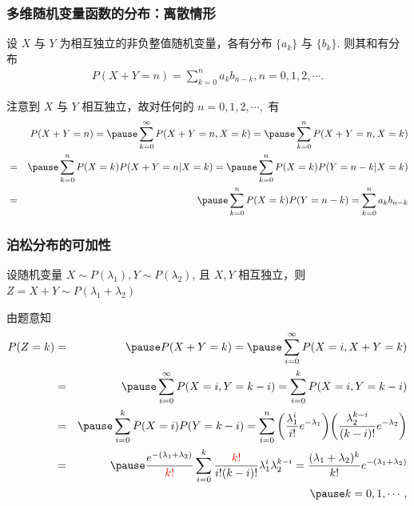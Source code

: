 \documentclass[Prob-All.tex]{subfiles}
\begin{document}
%
%
%
 \begin{frame}
 	\frametitle{多维随机变量函数的分布：离散情形}
 	\begin{thm}[离散卷积公式] 设 $X$ 与 $Y$ 为相互独立的非负整值随机变量，各有分布 $\{a_k\}$ 与 $\{b_k\}$. 则其和有分布
 		\begin{eqnarray*}
 			P(X+Y=n)=\sum_{k=0}^na_kb_{n-k}, n=0,1,2,\cdots.
 		\end{eqnarray*}
 	\end{thm}
 	\pause \zheng 注意到 $X$ 与 $Y$ 相互独立，故对任何的 $n=0,1,2,\cdots,$ 有
 	\begin{eqnarray*}
 		&&\hspace{-0.7cm}P(X+Y=n)=\pause \sum_{k=0}^\infty P(X+Y=n,X=k)=\pause \sum_{k=0}^n P(X+Y=n,X=k)\\
 		&=&\pause \sum_{k=0}^n P(X=k)P(X+Y=n|X=k)=\pause \sum_{k=0}^n P(X=k)P(Y=n-k|X=k)\\
 		&=&\pause \sum_{k=0}^n P(X=k)P(Y=n-k)=\sum_{k=0}^n a_kb_{n-k}
 	\end{eqnarray*}
 \end{frame}

 \begin{frame}
 	\frametitle{泊松分布的可加性}
 	\begin{exam}[泊松分布的可加性] 设随机变量 $X\sim P (\lambda_1), Y\sim P (\lambda_2)$, 且 $X,Y$ 相互独立，则 $Z=X+Y\sim P (\lambda_1+\lambda_2)$
 	\end{exam}

 	\pause \jieda 由题意知
 	\begin{eqnarray*}
 		P(Z=k)&=&\pause P(X+Y=k)=\pause \sum_{i=0}^\infty P(X=i, X+Y=k)\\
 		&=&\pause \sum_{i=0}^\infty P(X=i, Y=k-i)=\sum_{i=0}^kP(X=i,Y=k-i)\\
 		&=&\pause \sum_{i=0}^kP(X=i)P(Y=k-i)=\sum_{i=0}^n\bigg(\dfrac{\lambda_1^i}{i!}e^{-\lambda_1}\bigg)\bigg(\dfrac{\lambda_2^{k-i}}{(k-i)!}e^{-\lambda_2}\bigg)\\
 		&=&\pause \dfrac{e^{-(\lambda_1+\lambda_2)}}{\textcolor{red}{k!}}\sum_{i=0}^k\dfrac{\textcolor{red}{k!}}{i!(k-i)!}\lambda_1^i\lambda_2^{k-i}=\dfrac{(\lambda_1+\lambda_2)^k}{k!}e^{-(\lambda_1+\lambda_2)}\\
 		&&\pause k=0,1,\cdots,
 	\end{eqnarray*}

 \end{frame}
\end{document}
